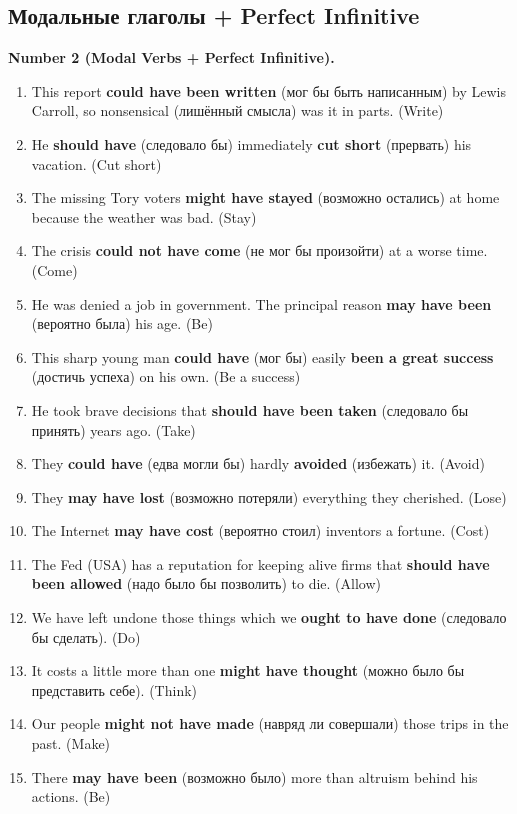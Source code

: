 \documentclass[main.tex]{subfiles}
\begin{document}
\subsection{Модальные глаголы + Perfect Infinitive}

\textbf{Number 2 (Modal Verbs + Perfect Infinitive).}

\begin{enumerate}[nosep]
	\item This report \textbf{could have been written} (мог бы быть написанным) by Lewis Carroll, so nonsensical (лишённый смысла) was it in parts. (Write)
	\item He \textbf{should have} (следовало бы) immediately \textbf{cut short} (прервать) his vacation. (Cut short)
	\item The missing Tory voters \textbf{might have stayed} (возможно остались) at home because the weather was bad. (Stay)
	\item The crisis \textbf{could not have come} (не мог бы произойти) at a worse time. (Come)
	\item He was denied a job in government. The principal reason \textbf{may have been} (вероятно была) his age. (Be)
	\item This sharp young man \textbf{could have} (мог бы) easily \textbf{been a great success} (достичь успеха) on his own. (Be a success)
	\item He took brave decisions that \textbf{should have been taken} (следовало бы принять) years ago. (Take)
	\item They \textbf{could have} (едва могли бы) hardly \textbf{avoided} (избежать) it. (Avoid)
	\item They \textbf{may have lost} (возможно потеряли) everything they cherished. (Lose)
	\item The Internet \textbf{may have cost} (вероятно стоил) inventors a fortune. (Cost)
	\item The Fed (USA) has a reputation for keeping alive firms that \textbf{should have been allowed} (надо было бы позволить) to die. (Allow)
	\item We have left undone those things which we \textbf{ought to have done} (следовало бы сделать). (Do)
	\item It costs a little more than one \textbf{might have thought} (можно было бы представить себе). (Think)
	\item Our people \textbf{might not have made} (навряд ли совершали) those trips in the past. (Make)
	\item There \textbf{may have been} (возможно было) more than altruism behind his actions. (Be)
\end{enumerate}
\end{document}
